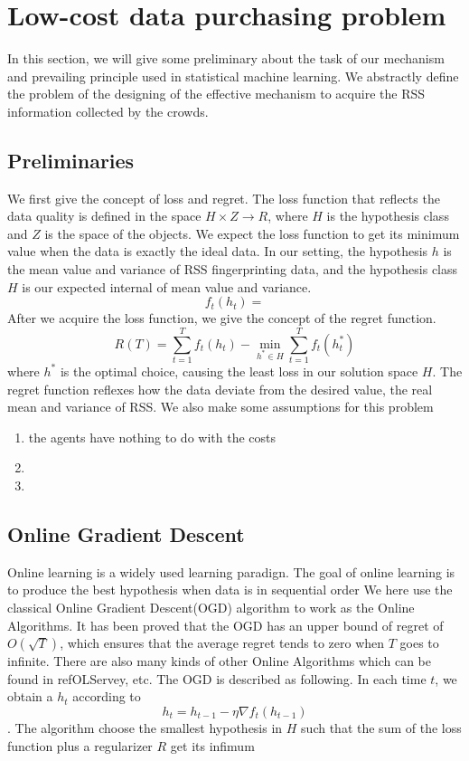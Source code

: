 \documentclass[10pt,conference,compsocconf,letterpaper]{IEEEtran}
\begin{document}
\section{Low-cost data purchasing problem}\label{probdef}
In this section, we will give some preliminary about the task of our mechanism and prevailing principle used in statistical machine learning. We abstractly define the problem of the designing of the effective mechanism to acquire the RSS information collected by the crowds. 

\subsection{Preliminaries}
We first give the concept of loss and regret. The loss function that reflects the data quality is defined in the space $H\times Z\to R$, where $H$ is the hypothesis class and $Z$ is the space of the objects. We expect the loss function to get its minimum value when the data is exactly the ideal data. In our setting, the hypothesis $h$ is the mean value and variance of RSS fingerprinting data, and the hypothesis class $H$ is our expected internal of mean value and  variance. 
\begin{equation}
f_t(h_t)=
\end{equation}
 After we acquire the loss function, we give the concept of the regret function.
\begin{equation}\label{def:reg}
R(T)=\sum_{t=1}^Tf_t(h_t)-\min_{h^*\in H}\sum_{t=1}^Tf_t(h^*_t)
\end{equation}
where $h^*$ is the optimal choice, causing the least loss in our solution space $H$. The regret function reflexes how the data deviate from the desired value, the real mean and variance of RSS. We also make some assumptions for this problem
\begin{enumerate}
\item the agents have nothing to do with the costs
\item 
\item 
\end{enumerate}


\subsection{Online Gradient Descent}
Online learning is a widely used learning paradign. The goal of online learning is to produce the best hypothesis when data is in sequential order
We here use the classical Online Gradient Descent(OGD) algorithm to work as the Online Algorithms. It has been proved that the OGD has an upper bound of regret of $O(\sqrt{T})$, which ensures that the average regret tends to zero when $T$ goes to infinite. There are also many kinds of other Online Algorithms which can be found in ref{OLServey}, etc. The OGD is described as following. In each time $t$, we obtain a $h_t$ according to
\begin{equation}
h_t=h_{t-1}-\eta \nabla f_t(h_{t-1})
\end{equation}.
The algorithm choose the smallest hypothesis in $H$ such that the sum of the loss function plus a regularizer $R$ get its infimum
\end{document}
